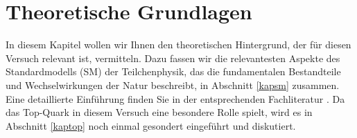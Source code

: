 \section{Theoretische Grundlagen}
\label{sm_chapter}
In diesem Kapitel wollen wir Ihnen den theoretischen Hintergrund, der f\"ur diesen Versuch relevant ist, vermitteln. Dazu fassen wir die relevantesten Aspekte des Standardmodells (SM) der Teilchenphysik, das die fundamentalen Bestandteile und Wechselwirkungen der Natur beschreibt, in Abschnitt \ref{kapsm} zusammen. Eine detaillierte Einf\"uhrung finden Sie in der entsprechenden Fachliteratur \cite{Griffiths, Berger}. Da das Top-Quark in diesem Versuch eine besondere Rolle spielt, wird es in Abschnitt \ref{kaptop} noch einmal gesondert eingef\"uhrt und diskutiert.

